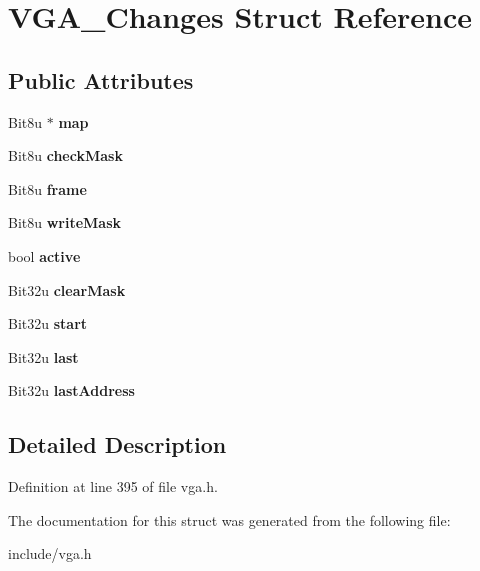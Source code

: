 \hypertarget{structVGA__Changes}{\section{V\-G\-A\-\_\-\-Changes Struct Reference}
\label{structVGA__Changes}
}
\subsection*{Public Attributes}
\begin{DoxyCompactItemize}
\item 
\hypertarget{structVGA__Changes_aae6472354347c41048cfab1219789b64}{Bit8u $\ast$ {\bfseries map}}\label{structVGA__Changes_aae6472354347c41048cfab1219789b64}

\item 
\hypertarget{structVGA__Changes_a6ae67831c523b25bdc21fa4db83afe43}{Bit8u {\bfseries check\-Mask}}\label{structVGA__Changes_a6ae67831c523b25bdc21fa4db83afe43}

\item 
\hypertarget{structVGA__Changes_ac26763f63772c078c7743773f53cde98}{Bit8u {\bfseries frame}}\label{structVGA__Changes_ac26763f63772c078c7743773f53cde98}

\item 
\hypertarget{structVGA__Changes_ad700dfb8efd57be98a89c9204d4af2f7}{Bit8u {\bfseries write\-Mask}}\label{structVGA__Changes_ad700dfb8efd57be98a89c9204d4af2f7}

\item 
\hypertarget{structVGA__Changes_a5e1eb3db4e0041fcaa05d426cf0bcf7b}{bool {\bfseries active}}\label{structVGA__Changes_a5e1eb3db4e0041fcaa05d426cf0bcf7b}

\item 
\hypertarget{structVGA__Changes_a64765a10e9ca419e7fe12ad0cd73f297}{Bit32u {\bfseries clear\-Mask}}\label{structVGA__Changes_a64765a10e9ca419e7fe12ad0cd73f297}

\item 
\hypertarget{structVGA__Changes_adcb1b4110d1643ca21b047ff682124b5}{Bit32u {\bfseries start}}\label{structVGA__Changes_adcb1b4110d1643ca21b047ff682124b5}

\item 
\hypertarget{structVGA__Changes_af476a9d8e176d26e02c9297300ed8baf}{Bit32u {\bfseries last}}\label{structVGA__Changes_af476a9d8e176d26e02c9297300ed8baf}

\item 
\hypertarget{structVGA__Changes_a65c792a3ddf72b6a016b3b221857f3b7}{Bit32u {\bfseries last\-Address}}\label{structVGA__Changes_a65c792a3ddf72b6a016b3b221857f3b7}

\end{DoxyCompactItemize}


\subsection{Detailed Description}


Definition at line 395 of file vga.\-h.



The documentation for this struct was generated from the following file\-:\begin{DoxyCompactItemize}
\item 
include/vga.\-h\end{DoxyCompactItemize}
